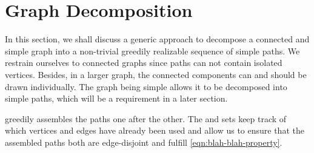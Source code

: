 \section{Graph Decomposition}
\label{sect:graph-decomposition}

In this section, we shall discuss a generic approach to decompose a connected and simple graph into a non-trivial greedily realizable sequence of simple paths. We restrain ourselves to connected graphs since paths can not contain isolated vertices. Besides, in a larger graph, the connected components can \emdash and should \emdash be drawn individually. The graph being simple allows it to be decomposed into simple paths, which will be a requirement in a later section.

 greedily assembles the paths one after the other.
The  and  sets keep track of which vertices and edges have already been used and allow us to ensure that the assembled paths both are edge-disjoint and fulfill \cref{eqn:blah-blah-property}.

\hfill

